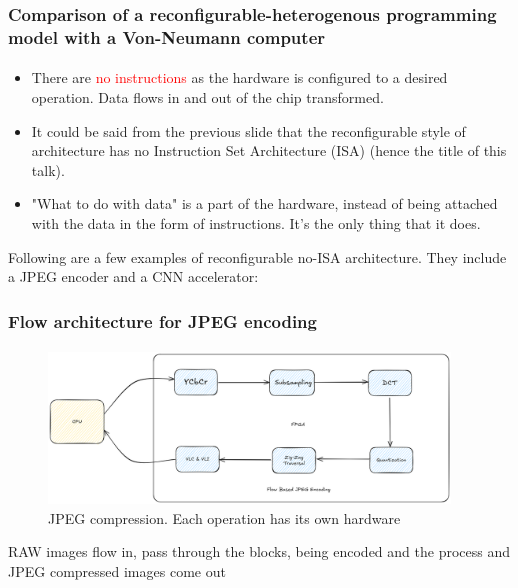 \documentclass{beamer}
\begin{document}
\begin{frame}[fragile]
  \frametitle{Comparison of a reconfigurable-heterogenous programming model with a Von-Neumann
  computer}
  \framesubtitle{}

  \begin{itemize}
    \item There are \textcolor{red}{no instructions} as the hardware
  is configured to a desired operation. Data flows in and out
  of the chip transformed. 

\item It could be said from the previous slide that the reconfigurable style of
  architecture has no Instruction Set Architecture (ISA) (hence the title
  of this talk). 

\item "What to do with data" is a part of the hardware, instead
  of being attached with the data in the form of instructions. It's the
  only thing that it does.
  \end{itemize}
  Following are a few examples of reconfigurable no-ISA architecture. They
  include a JPEG encoder and a CNN accelerator:
\end{frame}



\begin{frame}[fragile]
  \frametitle{Flow architecture for JPEG encoding}
  \framesubtitle{}
  \begin{figure}
    \centering
    \includegraphics[width=0.95\textwidth]{flowjpeg.png}
    \caption{JPEG compression. Each operation has its own hardware}
    \label{}
  \end{figure}

  RAW images flow in, pass through the blocks, being encoded
  and the process and JPEG compressed images come out
\end{frame}
\end{document}
